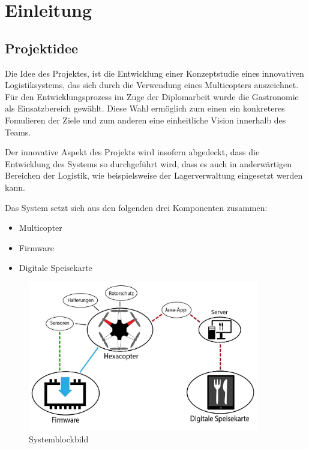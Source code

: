 \chapter{Einleitung}
\renewcommand{\kapitelautor}{Autor: Markus Kaiser}

\section{Projektidee}
Die Idee des Projektes, ist die Entwicklung einer Konzeptstudie eines innovativen Logistiksystems, das sich durch die Verwendung eines Multicopters auszeichnet.
Für den Entwicklungsprozess im Zuge der Diplomarbeit wurde die Gastronomie als Einsatzbereich gewählt. Diese Wahl ermöglich zum einen
ein konkreteres Fomulieren der Ziele und zum anderen eine einheitliche Vision innerhalb des Teams.

Der innovative Aspekt des Projekts wird insofern abgedeckt, dass die Entwicklung des Systems so durchgeführt wird,
dass es auch in anderwärtigen Bereichen der Logistik, wie beispielsweise der Lagerverwaltung eingesetzt werden kann.

Das System setzt sich aus den folgenden drei Komponenten zusammen:

\begin{itemize}
  \item Multicopter
  \item Firmware
  \item Digitale Speisekarte
\end{itemize}

\begin{figure}[H]
  \begin{centering}
  \includegraphics[width = 0.9\textwidth]{Bilder/systemblockbild.jpg}
  \par\end{centering}
  \caption{Systemblockbild}
  \label{Systemblockbild}
\end{figure}

